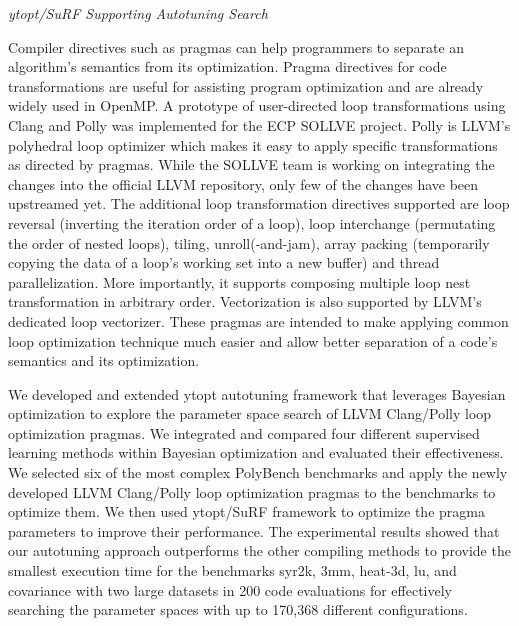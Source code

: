 \vspace*{.1in}
\noindent
\textit{ytopt/SuRF Supporting Autotuning Search}

Compiler directives such as pragmas can help programmers to separate an algorithm's semantics from its optimization. Pragma directives for code transformations are useful for assisting program optimization and are already widely used in OpenMP. A prototype of user-directed loop transformations using Clang and Polly was implemented for the ECP SOLLVE project.
Polly is LLVM's polyhedral loop optimizer which makes it easy to apply specific transformations as directed by pragmas.
While the SOLLVE team is working on integrating the changes into the official LLVM repository, only few of the changes have been upstreamed yet.
The additional loop transformation directives supported are loop reversal (inverting the iteration order of a loop), loop interchange (permutating the order of nested loops), tiling, unroll(-and-jam), array packing (temporarily copying the data of a loop's working set into a new buffer) and thread parallelization. 
More importantly, it supports composing multiple loop nest transformation in arbitrary order. Vectorization is also supported by LLVM's dedicated loop vectorizer.
These pragmas are intended to make applying common loop optimization technique much easier and allow better separation of a code's semantics and its optimization.

We developed and extended ytopt autotuning framework that leverages Bayesian optimization to explore the parameter space search of LLVM Clang/Polly loop optimization pragmas. We integrated and compared four different supervised learning methods within Bayesian optimization and evaluated their effectiveness. We selected six of the most complex PolyBench benchmarks and apply the newly developed LLVM Clang/Polly loop optimization pragmas to the benchmarks to optimize them. We then used ytopt/SuRF framework to optimize the pragma parameters to improve their performance. The experimental results showed that our autotuning approach outperforms the other compiling methods to provide the smallest execution time for the benchmarks syr2k, 3mm, heat-3d, lu, and covariance with two large datasets in 200 code evaluations for effectively searching the parameter spaces with up to 170,368 different configurations. 

